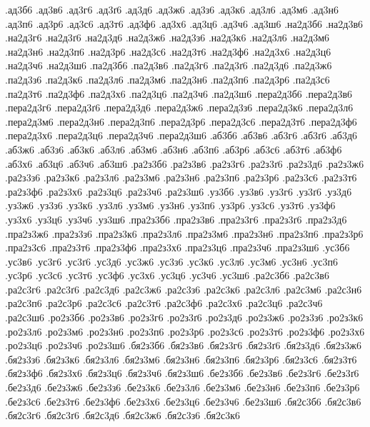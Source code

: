 {%
%
%
.ад3б6
.ад3в6
.ад3г6
.ад3ґ6
.ад3д6
.ад3ж6
.ад3з6
.ад3к6
.ад3л6
.ад3м6
.ад3н6
.ад3п6
.ад3р6
.ад3с6
.ад3т6
.ад3ф6
.ад3х6
.ад3ц6
.ад3ч6
.ад3ш6
.на2д3б6
.на2д3в6
.на2д3г6
.на2д3ґ6
.на2д3д6
.на2д3ж6
.на2д3з6
.на2д3к6
.на2д3л6
.на2д3м6
.на2д3н6
.на2д3п6
.на2д3р6
.на2д3с6
.на2д3т6
.на2д3ф6
.на2д3х6
.на2д3ц6
.на2д3ч6
.на2д3ш6
.па2д3б6
.па2д3в6
.па2д3г6
.па2д3ґ6
.па2д3д6
.па2д3ж6
.па2д3з6
.па2д3к6
.па2д3л6
.па2д3м6
.па2д3н6
.па2д3п6
.па2д3р6
.па2д3с6
.па2д3т6
.па2д3ф6
.па2д3х6
.па2д3ц6
.па2д3ч6
.па2д3ш6
.пера2д3б6
.пера2д3в6
.пера2д3г6
.пера2д3ґ6
.пера2д3д6
.пера2д3ж6
.пера2д3з6
.пера2д3к6
.пера2д3л6
.пера2д3м6
.пера2д3н6
.пера2д3п6
.пера2д3р6
.пера2д3с6
.пера2д3т6
.пера2д3ф6
.пера2д3х6
.пера2д3ц6
.пера2д3ч6
.пера2д3ш6
.аб3б6
.аб3в6
.аб3г6
.аб3ґ6
.аб3д6
.аб3ж6
.аб3з6
.аб3к6
.аб3л6
.аб3м6
.аб3н6
.аб3п6
.аб3р6
.аб3с6
.аб3т6
.аб3ф6
.аб3х6
.аб3ц6
.аб3ч6
.аб3ш6
.ра2з3б6
.ра2з3в6
.ра2з3г6
.ра2з3ґ6
.ра2з3д6
.ра2з3ж6
.ра2з3з6
.ра2з3к6
.ра2з3л6
.ра2з3м6
.ра2з3н6
.ра2з3п6
.ра2з3р6
.ра2з3с6
.ра2з3т6
.ра2з3ф6
.ра2з3х6
.ра2з3ц6
.ра2з3ч6
.ра2з3ш6
.уз3б6
.уз3в6
.уз3г6
.уз3ґ6
.уз3д6
.уз3ж6
.уз3з6
.уз3к6
.уз3л6
.уз3м6
.уз3н6
.уз3п6
.уз3р6
.уз3с6
.уз3т6
.уз3ф6
.уз3х6
.уз3ц6
.уз3ч6
.уз3ш6
.пра2з3б6
.пра2з3в6
.пра2з3г6
.пра2з3ґ6
.пра2з3д6
.пра2з3ж6
.пра2з3з6
.пра2з3к6
.пра2з3л6
.пра2з3м6
.пра2з3н6
.пра2з3п6
.пра2з3р6
.пра2з3с6
.пра2з3т6
.пра2з3ф6
.пра2з3х6
.пра2з3ц6
.пра2з3ч6
.пра2з3ш6
.ус3б6
.ус3в6
.ус3г6
.ус3ґ6
.ус3д6
.ус3ж6
.ус3з6
.ус3к6
.ус3л6
.ус3м6
.ус3н6
.ус3п6
.ус3р6
.ус3с6
.ус3т6
.ус3ф6
.ус3х6
.ус3ц6
.ус3ч6
.ус3ш6
.ра2с3б6
.ра2с3в6
.ра2с3г6
.ра2с3ґ6
.ра2с3д6
.ра2с3ж6
.ра2с3з6
.ра2с3к6
.ра2с3л6
.ра2с3м6
.ра2с3н6
.ра2с3п6
.ра2с3р6
.ра2с3с6
.ра2с3т6
.ра2с3ф6
.ра2с3х6
.ра2с3ц6
.ра2с3ч6
.ра2с3ш6
.ро2з3б6
.ро2з3в6
.ро2з3г6
.ро2з3ґ6
.ро2з3д6
.ро2з3ж6
.ро2з3з6
.ро2з3к6
.ро2з3л6
.ро2з3м6
.ро2з3н6
.ро2з3п6
.ро2з3р6
.ро2з3с6
.ро2з3т6
.ро2з3ф6
.ро2з3х6
.ро2з3ц6
.ро2з3ч6
.ро2з3ш6
.бя2з3б6
.бя2з3в6
.бя2з3г6
.бя2з3ґ6
.бя2з3д6
.бя2з3ж6
.бя2з3з6
.бя2з3к6
.бя2з3л6
.бя2з3м6
.бя2з3н6
.бя2з3п6
.бя2з3р6
.бя2з3с6
.бя2з3т6
.бя2з3ф6
.бя2з3х6
.бя2з3ц6
.бя2з3ч6
.бя2з3ш6
.бе2з3б6
.бе2з3в6
.бе2з3г6
.бе2з3ґ6
.бе2з3д6
.бе2з3ж6
.бе2з3з6
.бе2з3к6
.бе2з3л6
.бе2з3м6
.бе2з3н6
.бе2з3п6
.бе2з3р6
.бе2з3с6
.бе2з3т6
.бе2з3ф6
.бе2з3х6
.бе2з3ц6
.бе2з3ч6
.бе2з3ш6
.бя2с3б6
.бя2с3в6
.бя2с3г6
.бя2с3ґ6
.бя2с3д6
.бя2с3ж6
.бя2с3з6
.бя2с3к6
}
